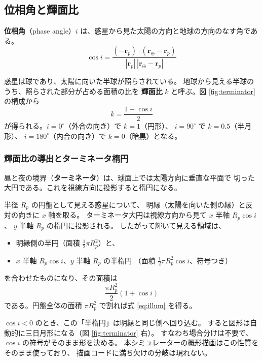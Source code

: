 \documentclass[a4paper,11pt]{ltjsarticle}
\newcommand{\vek}[1]{\boldsymbol{#1}}
\begin{document}
\subsection{位相角と輝面比}

\textbf{位相角}（phase angle）$i$ は、惑星から見た太陽の方向と地球の方向のなす角である。
\begin{equation}
  \cos i
  = \frac{(-\vek{r}_p)\cdot(\vek{r}_\oplus - \vek{r}_p)}
         {|\vek{r}_p|\,|\vek{r}_\oplus - \vek{r}_p|}
  \label{eq:phaseangle}
\end{equation}

惑星は球であり、太陽に向いた半球が照らされている。
地球から見える半球のうち、照らされた部分が占める面積の比を
\textbf{輝面比} $k$ と呼ぶ。図 \ref{fig:terminator} の構成から
\begin{equation}
  k = \frac{1 + \cos i}{2}
  \label{eq:illum}
\end{equation}
が得られる。$i=0^\circ$（外合の向き）で $k=1$（円形）、
$i=90^\circ$ で $k=0.5$（半月形）、
$i=180^\circ$（内合の向き）で $k=0$（暗黒）となる。

\subsubsection*{輝面比の導出とターミネータ楕円}

昼と夜の境界（\textbf{ターミネータ}）は、球面上では太陽方向に垂直な平面で
切った大円である。これを視線方向に投影すると楕円になる。

半径 $R_p$ の円盤として見える惑星について、
明縁（太陽を向いた側の縁）と反対の向きに $x$ 軸を取る。
ターミネータ大円は視線方向から見て $x$ 半軸 $R_p\cos i$、
$y$ 半軸 $R_p$ の楕円に投影される。
したがって輝いて見える領域は、

\begin{itemize}
  \item 明縁側の半円（面積 $\tfrac{1}{2}\pi R_p^2$）と、
  \item $x$ 半軸 $R_p\cos i$、$y$ 半軸 $R_p$ の半楕円
        （面積 $\tfrac{1}{2}\pi R_p^2\cos i$、符号つき）
\end{itemize}

を合わせたものになり、その面積は
\begin{equation}
  \frac{\pi R_p^2}{2}(1 + \cos i)
\end{equation}
である。円盤全体の面積 $\pi R_p^2$ で割れば式 \eqref{eq:illum} を得る。

$\cos i < 0$ のとき、この「半楕円」は明縁と同じ側へ回り込む。
すると図形は自動的に三日月形になる（図 \ref{fig:terminator} 右）。
すなわち場合分けは不要で、$\cos i$ の符号がそのまま形を決める。
本シミュレーターの概形描画はこの性質をそのまま使っており、
描画コードに満ち欠けの分岐は現れない。
\end{document}

